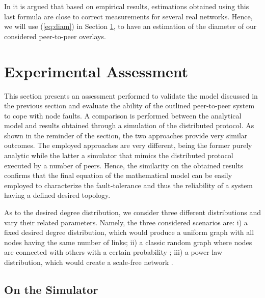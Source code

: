 \documentclass[a4paper,twosided]{article}
\begin{document}
In \cite{newmanHandbook} it is argued that based on empirical results, estimations obtained using this last formula are close to correct measurements for several real networks. Hence, we will use (\ref{eq:diam}) in Section \ref{sec:res}, to have an estimation of the diameter of our considered peer-to-peer overlays.



\section{Experimental Assessment}
\label{sec:res}

This section presents an assessment performed to validate the model discussed in the previous section and evaluate the ability of the outlined peer-to-peer system to cope with node faults. A comparison is performed between the analytical model and results obtained through a simulation of the distributed protocol. As shown in the reminder of the section, the two approaches provide very similar outcomes. 
The employed approaches are very different, being the former purely analytic while the latter a simulator that mimics the distributed protocol executed by a number of peers. Hence, the similarity on the obtained results confirms that the final equation of the mathematical model can be easily employed to characterize the fault-tolerance and thus the reliability of  a system having a defined desired topology.

As to the desired degree distribution, we consider three different distributions and vary their related parameters. Namely, the three considered scenarios are: i) a fixed desired degree distribution, which would  produce a uniform graph with all nodes having the same number of links; ii) a classic random graph where nodes are connected with others with a certain probability \cite{newmanHandbook}; iii) a power law distribution, which would create a scale-free network \cite{Barabasi2000,Newman03thestructure,Aiello00arandom,simutools}.


\subsection{On the Simulator}
\end{document}
